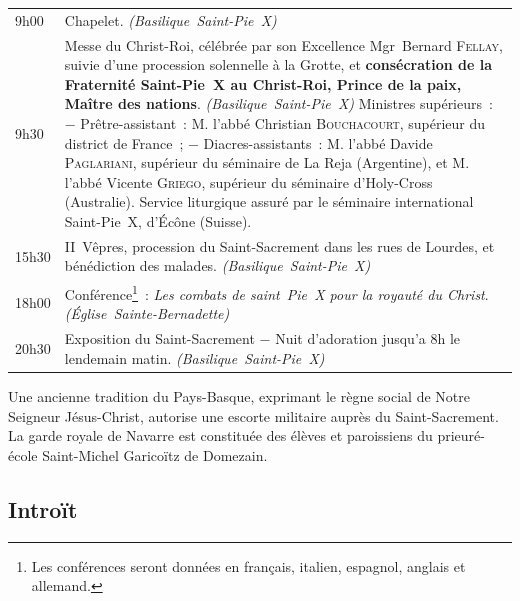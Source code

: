 \documentclass[%
a5paper%
,11pt%
,DIV=15%
,titlepage=on%
,headings=optiontoheadandtoc%
,headings=small%
,parskip=false%
,openany%
]{scrbook}
\newcommand{\lieu}[1]{\hfill\linebreak[3]\hspace*{\stretch{1}}\nolinebreak\mbox{\emph{(#1)}}}
\let\oldaddchap\addchap
\def\addchap#1{\oldaddchap{#1}\markright{Pèlerinage du Christ-Roi}}
\begin{document}
\begin{tabularx}{\textwidth-\parindent}{l!{:}X}
9h00	& Chapelet.
	  \lieu{Basilique Saint-Pie X}\\
9h30	& Messe du Christ-Roi, célébrée par son Excellence Mgr Bernard \textsc{Fellay}, suivie d'une procession solennelle à la Grotte, et \textbf{consécration de la Fraternité Saint-Pie X au Christ-Roi, Prince de la paix, Maître des nations}.
	  \lieu{Basilique Saint-Pie X}\linebreak
	  Ministres supérieurs :\linebreak
	  − Prêtre-assistant : M. l'abbé Christian \textsc{Bouchacourt}, supérieur du district de France ;\linebreak
	  − Diacres-assistants : M. l'abbé Davide \textsc{Paglariani}, supérieur du séminaire de La Reja (Argentine), et M. l'abbé Vicente \textsc{Griego}, supérieur du séminaire d'Holy-Cross (Australie).\linebreak
	  Service liturgique assuré par le séminaire international Saint-Pie X, d'Écône (Suisse).\\
15h30	& II\iemes\ Vêpres, procession du Saint-Sacrement dans les rues de Lourdes, et bénédiction des malades.
	  \lieu{Basilique Saint-Pie X}\\
18h00	& Conférence\footnote{Les conférences seront données en français, italien, espagnol, anglais et allemand.} : \emph{Les combats de saint Pie X pour la royauté du Christ}.
	  \lieu{Église Sainte-Bernadette}\\
20h30	& Exposition du Saint-Sacrement − Nuit d'adoration jusqu'a 8h le lendemain matin.
	  \lieu{Basilique Saint-Pie X}
\end{tabularx}

\vfill
{\noindent\footnotesize Une ancienne tradition du Pays-Basque, exprimant le règne social de Notre Seigneur Jésus-Christ, autorise une escorte militaire auprès du Saint-Sacrement. La garde royale de Navarre est constituée des élèves et paroissiens du prieuré-école Saint-Michel Garicoïtz de Domezain.}




\subsection*{Introït}
\end{document}
